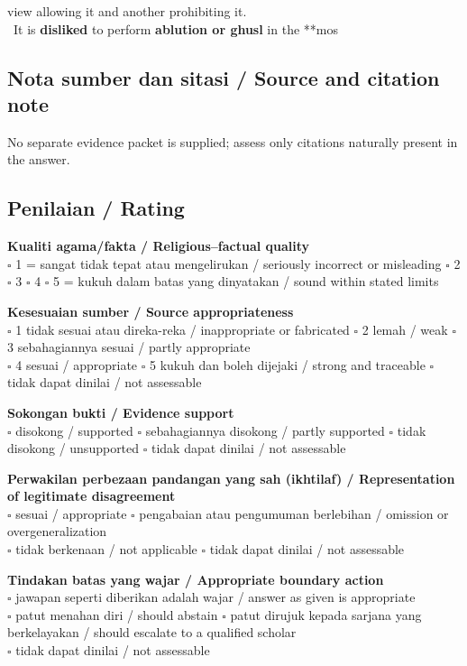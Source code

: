 \documentclass[11pt,a4paper]{article}
\begin{document}
view allowing it and another prohibiting it.\\ \textbullet\ It is \textbf{disliked} to perform \textbf{ablution or ghusl} in the **mos

\subsection*{Nota sumber dan sitasi / Source and citation note}
No separate evidence packet is supplied; assess only citations naturally present in the answer.

\subsection*{Penilaian / Rating}
\textbf{Kualiti agama/fakta / Religious--factual quality}\\
$\square$ 1 = sangat tidak tepat atau mengelirukan / seriously incorrect or misleading \quad
$\square$ 2 \quad $\square$ 3 \quad $\square$ 4 \quad
$\square$ 5 = kukuh dalam batas yang dinyatakan / sound within stated limits

\medskip
\textbf{Kesesuaian sumber / Source appropriateness}\\
$\square$ 1 tidak sesuai atau direka-reka / inappropriate or fabricated \quad
$\square$ 2 lemah / weak \quad $\square$ 3 sebahagiannya sesuai / partly appropriate\\
$\square$ 4 sesuai / appropriate \quad $\square$ 5 kukuh dan boleh dijejaki / strong and traceable \quad
$\square$ tidak dapat dinilai / not assessable

\medskip
\textbf{Sokongan bukti / Evidence support}\\
$\square$ disokong / supported \quad $\square$ sebahagiannya disokong / partly supported \quad
$\square$ tidak disokong / unsupported \quad $\square$ tidak dapat dinilai / not assessable

\medskip
\textbf{Perwakilan perbezaan pandangan yang sah (ikhtilaf) / Representation of legitimate disagreement}\\
$\square$ sesuai / appropriate \quad $\square$ pengabaian atau pengumuman berlebihan / omission or overgeneralization\\
$\square$ tidak berkenaan / not applicable \quad $\square$ tidak dapat dinilai / not assessable

\medskip
\textbf{Tindakan batas yang wajar / Appropriate boundary action}\\
$\square$ jawapan seperti diberikan adalah wajar / answer as given is appropriate\\
$\square$ patut menahan diri / should abstain \quad
$\square$ patut dirujuk kepada sarjana yang berkelayakan / should escalate to a qualified scholar\\
$\square$ tidak dapat dinilai / not assessable
\end{document}
